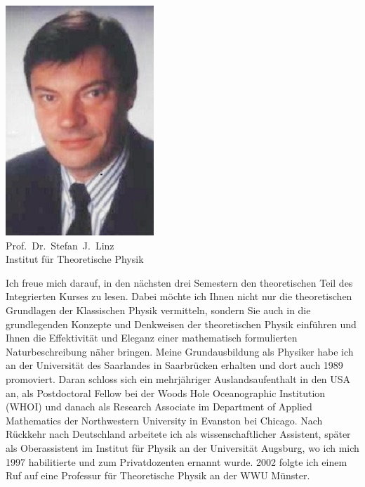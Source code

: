 \begin{multicols}{2}
\begin{center}
\includegraphics[width=0.71\columnwidth]{res/vorstellungsfotos/linz.jpg}\\
Prof.\ Dr.\ Stefan\ J.\ Linz\\
Institut für Theoretische Physik
\end{center}

Ich freue mich darauf, in den nächsten drei Semestern den theoretischen Teil des Integrierten Kurses zu lesen. Dabei möchte ich Ihnen nicht nur die theoretischen Grundlagen der Klassischen Physik vermitteln, sondern Sie auch in die grundlegenden Konzepte und Denkweisen der
theoretischen Physik einführen und Ihnen die Effektivität und Eleganz einer mathematisch formulierten Naturbeschreibung näher bringen. Meine Grundausbildung als Physiker habe ich an der Universität des Saarlandes in Saarbrücken erhalten und dort auch 1989 promoviert. Daran schloss sich ein mehrjähriger Auslandsaufenthalt in den USA an, als Postdoctoral Fellow bei der Woods Hole Oceanographic Institution (WHOI) und danach als Research Associate im Department of Applied Mathematics der Northwestern University in Evanston bei Chicago. Nach Rückkehr nach Deutschland arbeitete ich als wissenschaftlicher Assistent, später als Oberassistent im Institut für Physik an der Universität Augsburg, wo ich mich 1997 habilitierte und zum Privatdozenten ernannt wurde. 2002 folgte ich einem Ruf auf eine Professur für Theoretische Physik an der WWU Münster.


\end{multicols}
